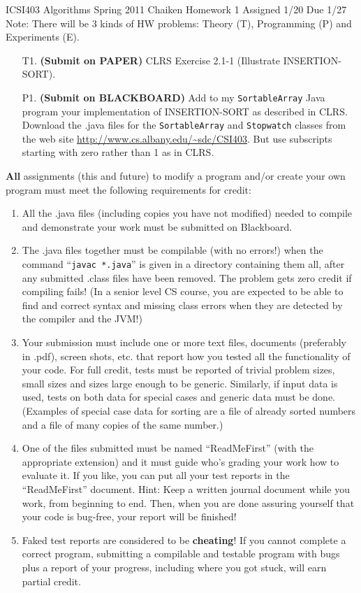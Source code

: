 \documentclass{article}
\begin{document}
\begin{center}
ICSI403 Algorithms Spring 2011 Chaiken\hfill
Homework 1\hfill
Assigned 1/20\hfill
Due 1/27\\
Note: There will be 3 kinds of HW problems: Theory (T), Programming (P) and
Experiments (E).
\end{center}

\begin{itemize}

\item[T1.] \textbf{(Submit on PAPER)}
CLRS Exercise 2.1-1 (Illustrate INSERTION-SORT).
\item[P1.] \textbf{(Submit on BLACKBOARD)}
Add to my \texttt{SortableArray} Java program your implementation
of INSERTION-SORT as described in CLRS.  Download the .java files for the
\texttt{SortableArray} and \texttt{Stopwatch} classes from the web site
\url{http://www.cs.albany.edu/~sdc/CSI403}.  But use
subscripts starting with zero rather than 1 as in CLRS.
\end{itemize}

\textbf{All} assignments (this and future)
to modify a program and/or create your own
program must meet the following requirements for credit:
\begin{enumerate}
\item All the .java files (including copies you have not modified)
needed to compile and demonstrate your work must be submitted on Blackboard.
\item The .java files together must be compilable (with no errors!) when
the command ``\verb|javac *.java|'' is given in a directory containing them
all, after any submitted .class files have been removed.  
The problem gets zero credit if compiling fails! (In a senior level CS 
course, you are expected to be able to find and correct syntax and
missing class errors when they are detected by the compiler and
the JVM!)
\item Your submission must include one or more text files, documents 
(preferably in .pdf), screen shots, etc. that report how you tested all
the functionality of your code.  For full credit, tests must be reported
of trivial problem sizes, small sizes and sizes large enough to be generic.
Similarly, if input data is used, tests on both data for special cases and
generic data must be done.  (Examples of special case data for sorting are
a file of already sorted numbers and a file of many copies of the same number.)
\item One of the files submitted must be named ``ReadMeFirst'' (with the
appropriate extension) and it must guide who's grading your work how to
evaluate it.  If you like, you can put all your test reports in the 
``ReadMeFirst'' document.  Hint: Keep a written journal document
while you work, from
beginning to end.  Then, when you are done assuring yourself that your 
code is bug-free, your report will be finished!
\item Faked test reports are considered to be \textbf{cheating}!  
If you cannot complete a correct program, submitting a compilable
and testable program with bugs plus a report of your progress, including
where you got stuck, will earn partial credit.
\end{enumerate}
\end{document}
